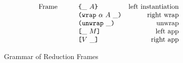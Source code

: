 \documentclass[../main.tex]{subfiles}
\begin{document}
\begin{figure*}[t]
    \centering
    \[\begin{array}{lrclr}
        \textrm{Frame} &   &     & \texttt{\{}\_ ~ A\texttt{\}}                     & \textrm{left instantiation}\\
                       &   &     & \texttt{(} \texttt{wrap} ~ \alpha ~ A ~ \_ \texttt{)}            & \textrm{right wrap}\\
                       &   &     & \texttt{(} \texttt{unwrap} ~ \_ \texttt{)}{}                        & \textrm{unwrap}\\
                       &   &     & \texttt{[} \_ ~ M \texttt{]}                      & \textrm{left app}\\
                       &   &     & \texttt{[} V ~ \_ \texttt{]}                     & \textrm{right app}\\
    \end{array}\]
    \caption{Grammar of Reduction Frames}
    \label{fig:Plutus_core_reduction_frames}
\end{figure*}
\end{document}
